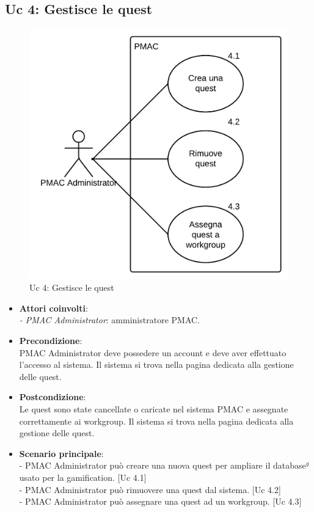 \documentclass[10pt,a4paper]{article}
\begin{document}
\subsection{Uc 4: Gestisce le quest}
\begin{figure}[ht]
\centering
\caption{Uc 4: Gestisce le quest}
\includegraphics[scale=0.9]{UseCase/Uc4} %
\end{figure}

\begin{itemize}
\item \textbf{Attori coinvolti}:\\
\emph{- PMAC Administrator}: amministratore PMAC.

\item \textbf{Precondizione}:\\
PMAC Administrator deve possedere un account e deve aver effettuato l'accesso al sistema. Il sistema si trova nella pagina dedicata alla gestione delle quest.

\item \textbf{Postcondizione}:\\
Le quest sono state cancellate o caricate nel sistema PMAC e assegnate correttamente ai workgroup. Il sistema si trova nella pagina dedicata alla gestione delle quest.

\item \textbf{Scenario principale}:\\
- PMAC Administrator può creare una nuova quest per ampliare il database$^g$ usato per la gamification. [Uc 4.1]\\
- PMAC Administrator può rimuovere una quest dal sistema. [Uc 4.2]\\
- PMAC Administrator può assegnare una quest ad un workgroup. [Uc 4.3]
\end{itemize}
\end{document}
